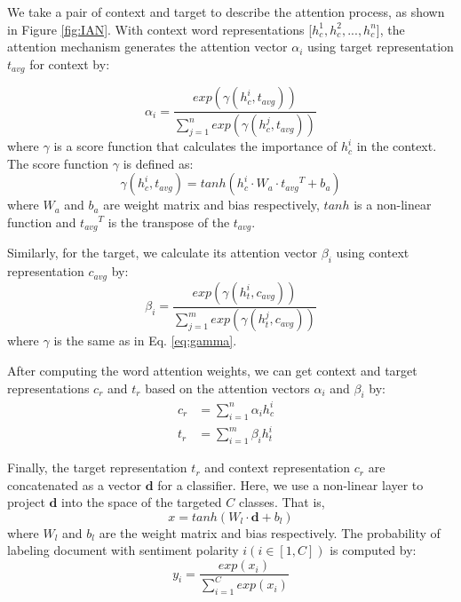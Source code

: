 \documentclass{article}
\begin{document}
We take a pair of context and target to describe the attention process, as shown in Figure \ref{fig:IAN}.
With context word representations [$h_c^1, h_c^2, ..., h_c^{n}$], the attention mechanism generates the attention vector $\alpha_i$ using target representation $t_{avg}$ for context by:

\begin{equation}
\alpha_i = \frac{exp(\gamma(h^i_c, t_{avg}))}{\sum_{j=1}^{n} exp(\gamma(h^j_c, t_{avg}))}
\end{equation}
where $\gamma$ is a score function that calculates the importance of $h^i_c$ in the context. The score function $\gamma$ is defined as:
\begin{equation}
\gamma(h^i_c, t_{avg}) = tanh(h^i_c \cdot W_a \cdot {t_{avg}}^T + b_a)
\label{eq:gamma}
\end{equation}
where  $W_a$ and $b_a$ are weight matrix and bias respectively, $tanh$ is a non-linear function and ${t_{avg}}^T$ is the transpose of the $t_{avg}$.

Similarly, for the target, we calculate its attention vector $\beta_i$ using context representation $c_{avg}$  by:
\begin{equation}
\beta_i = \frac{exp(\gamma(h^i_t, c_{avg}))}{\sum_{j=1}^{m} exp(\gamma(h^j_t, c_{avg}))}
\end{equation}
where $\gamma$ is the same as in Eq. \ref{eq:gamma}.

After computing the word attention weights, we can get context and target representations $c_r$ and $t_r$ based on the attention vectors $\alpha_i$ and $\beta_i$ by: 
\begin{align}
c_r &= \sum_{i=1}^{n} \alpha_i  h_c^i &\\
t_r &= \sum_{i=1}^{m} \beta_i  h_t^i &
\end{align}

Finally, the target representation $t_r$ and context representation $c_r$ are concatenated as a vector $\textbf{d}$ for a classifier. Here, we use a non-linear layer to project $\textbf{d}$ into the space of the targeted $C$ classes. That is,
\begin{equation}
x = tanh(W_l\cdot \textbf{d}+b_l)
\end{equation}
where $W_l$ and $b_l$ are the weight matrix and bias respectively.
The probability of labeling document with sentiment polarity $i (i \in [1, C])$ is computed by:
\begin{equation}\label{equ:prob}
y_i = \frac{exp(x_i)}{\sum_{i=1}^{C} exp(x_i)}
\end{equation}
\end{document}
